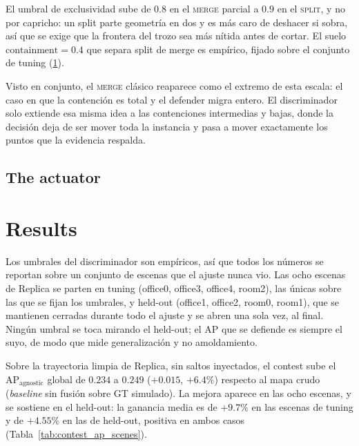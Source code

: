 El umbral de exclusividad sube de $0.8$ en el \textsc{merge} parcial a $0.9$ en el
\textsc{split}, y no por capricho: un split parte geometría en dos y es más caro de deshacer
si sobra, así que se exige que la frontera del trozo sea más nítida antes de cortar. El suelo
$\mathrm{containment} = 0.4$ que separa split de merge es empírico, fijado sobre el conjunto
de \foreignlanguage{english}{tuning} (\ref{sec:contest_results}).

Visto en conjunto, el \textsc{merge} clásico reaparece como el extremo de esta escala: el
caso en que la contención es total y el defender migra entero. El discriminador solo extiende
esa misma idea a las contenciones intermedias y bajas, donde la decisión deja de ser mover
toda la instancia y pasa a mover exactamente los puntos que la evidencia respalda.

\subsection{The actuator}
\label{sec:contest_actuator}

\section{Results}
\label{sec:contest_results}

Los umbrales del discriminador son empíricos, así que todos los números se reportan sobre un
conjunto de escenas que el ajuste nunca vio. Las ocho escenas de Replica se parten en
\foreignlanguage{english}{tuning} (office0, office3, office4, room2), las únicas sobre las que
se fijan los umbrales, y \foreignlanguage{english}{held-out} (office1, office2, room0, room1),
que se mantienen cerradas durante todo el ajuste y se abren una sola vez, al final. Ningún
umbral se toca mirando el \foreignlanguage{english}{held-out}; el $\mathrm{AP}$ que se defiende
es siempre el suyo, de modo que mide generalización y no amoldamiento.

Sobre la trayectoria limpia de Replica, sin saltos inyectados, el contest sube el
$\mathrm{AP}_{\text{agnostic}}$ global de $0.234$ a $0.249$ ($+0.015$, $+6.4\%$) respecto al
mapa crudo (\emph{baseline} sin fusión sobre GT simulado). La mejora aparece en las ocho
escenas, y se sostiene en el \foreignlanguage{english}{held-out}: la ganancia media es de
$+9.7\%$ en las escenas de \foreignlanguage{english}{tuning} y de $+4.55\%$ en las de
\foreignlanguage{english}{held-out}, positiva en ambos casos
(Tabla~\ref{tab:contest_ap_scenes}).

